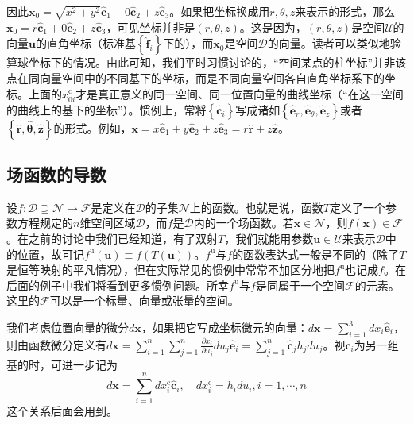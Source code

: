 \documentclass[main.tex]{subfiles}
\begin{document}
\begin{example}[柱坐标]
因此$\mathbf{x}_0=\sqrt{x^2+y^2}\mathbf{\hat{c}}_1+0\mathbf{\hat{c}}_2+z\mathbf{\hat{c}}_3$。如果把坐标换成用$r,\theta,z$来表示的形式，那么$\mathbf{x}_0=r\mathbf{\hat{c}}_1+0\mathbf{\hat{c}}_2+z\mathbf{\hat{c}}_3$，可见坐标并非是$\left(r,\theta,z\right)$。这是因为，$\left(r,\theta,z\right)$是空间$\mathcal{U}$的向量$\mathbf{u}$的直角坐标（标准基$\left\{\mathbf{\hat{f}}_i\right\}$下的），而$\mathbf{x}_0$是空间$\mathcal{D}$的向量。读者可以类似地验算球坐标下的情况。由此可知，我们平时习惯讨论的，“空间某点的柱坐标”并非该点在同向量空间中的不同基下的坐标，而是不同向量空间各自直角坐标系下的坐标。上面的$x_{0i}^\mathrm{c}$才是真正意义的同一空间、同一位置向量的曲线坐标（“在这一空间的曲线上的基下的坐标”）。惯例上，常将$\left\{\mathbf{\hat{c}}_i\right\}$写成诸如$\left\{\mathbf{\hat{e}}_r,\mathbf{\hat{e}}_\theta,\mathbf{\hat{e}}_z\right\}$或者$\left\{\mathbf{\hat{r}},\hat{\boldsymbol{\theta}},\mathbf{\hat{z}}\right\}$的形式。例如，$\mathbf{x}=x\mathbf{\hat{e}}_1+y\mathbf{\hat{e}}_2+z\mathbf{\hat{e}}_3=r\mathbf{\hat{r}}+z\mathbf{\hat{z}}$。
\end{example}

\subsection{场函数的导数}
设$f:\mathcal{D}\supseteq\mathcal{N}\rightarrow\mathcal{F}$是定义在$\mathcal{D}$的子集$\mathcal{N}$上的函数。也就是说，函数$T$定义了一个参数方程规定的$n$维空间区域$\mathcal{D}$，而$f$是$\mathcal{D}$内的一个场函数。若$\mathbf{x}\in\mathcal{N}$，则$f\left(\mathbf{x}\right)\in\mathcal{F}$。在之前的讨论中我们已经知道，有了双射$T$，我们就能用参数$\mathbf{u}\in\mathcal{U}$来表示$\mathcal{D}$中的位置，故可记$f^\mathrm{u}\left(\mathbf{u}\right)\equiv f\left(T\left(\mathbf{u}\right)\right)$。$f^\mathrm{u}$与$f$的函数表达式一般是不同的（除了$T$是恒等映射的平凡情况），但在实际常见的惯例中常常不加区分地把$f^\mathrm{u}$也记成$f$。在后面的例子中我们将看到更多惯例问题。所幸$f^\mathrm{u}$与$f$是同属于一个空间$\mathcal{F}$的元素。这里的$\mathcal{F}$可以是一个标量、向量或张量的空间。

我们考虑位置向量的微分$d\mathbf{x}$，如果把它写成坐标微元的向量：$d\mathbf{x}=\sum_{i=1}^3dx_i\mathbf{\hat{e}}_i$，则由函数微分定义有$d\mathbf{x}=\sum_{i=1}^n\sum_{j=1}^n\frac{\partial x_i}{\partial u_j}du_j\mathbf{\hat{e}}_i=\sum_{j=1}^n\mathbf{\hat{c}}_jh_jdu_j$。视$\mathbf{\hat{c}}_i$为另一组基的时，可进一步记为
\[d\mathbf{x}=\sum_{i=1}^ndx_i^\mathrm{c}\mathbf{\hat{c}}_i,\quad dx_i^\mathrm{c}=h_idu_i,i=1,\cdots,n\]
这个关系后面会用到。
\end{document}
